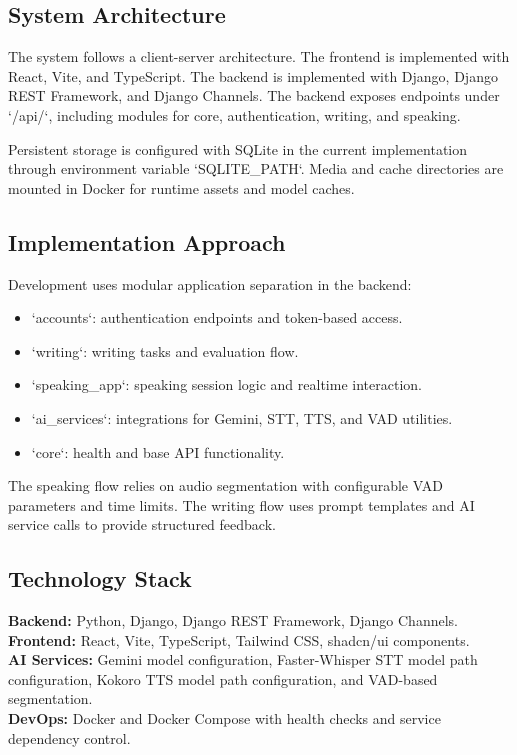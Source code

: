 ﻿\documentclass[conference]{IEEEtran}
\begin{document}
\subsection{System Architecture}
The system follows a client-server architecture. The frontend is implemented with React, Vite, and TypeScript. The backend is implemented with Django, Django REST Framework, and Django Channels. The backend exposes endpoints under `/api/`, including modules for core, authentication, writing, and speaking.

Persistent storage is configured with SQLite in the current implementation through environment variable `SQLITE_PATH`. Media and cache directories are mounted in Docker for runtime assets and model caches.

\subsection{Implementation Approach}
Development uses modular application separation in the backend:
\begin{itemize}
    \item `accounts`: authentication endpoints and token-based access.
    \item `writing`: writing tasks and evaluation flow.
    \item `speaking_app`: speaking session logic and realtime interaction.
    \item `ai_services`: integrations for Gemini, STT, TTS, and VAD utilities.
    \item `core`: health and base API functionality.
\end{itemize}

The speaking flow relies on audio segmentation with configurable VAD parameters and time limits. The writing flow uses prompt templates and AI service calls to provide structured feedback.

\subsection{Technology Stack}
\textbf{Backend:} Python, Django, Django REST Framework, Django Channels.\\
\textbf{Frontend:} React, Vite, TypeScript, Tailwind CSS, shadcn/ui components.\\
\textbf{AI Services:} Gemini model configuration, Faster-Whisper STT model path configuration, Kokoro TTS model path configuration, and VAD-based segmentation.\\
\textbf{DevOps:} Docker and Docker Compose with health checks and service dependency control.
\end{document}
